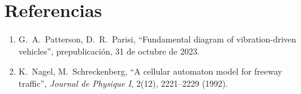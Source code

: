 \documentclass[11pt,a4paper]{article}
\begin{document}
\clearpage
\section*{Referencias}
\begin{enumerate}
\item G.~A.~Patterson, D.~R.~Parisi, ``Fundamental diagram of vibration-driven
vehicles'', prepublicación, 31 de octubre de 2023.
\item K.~Nagel, M.~Schreckenberg, ``A cellular automaton model for freeway traffic'',
\emph{Journal de Physique I}, 2(12), 2221--2229 (1992).
\end{enumerate}
\end{document}
